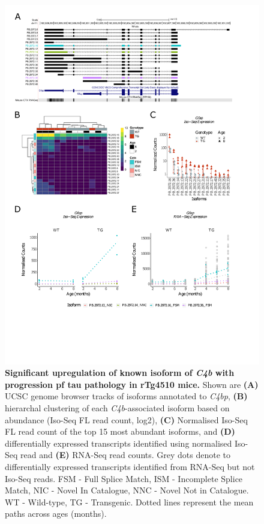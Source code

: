 \begin{figure}[!htp]
	\centering
	\includegraphics[page=2,trim={1.5cm 4.8cm 2cm 1cm}, scale = 0.85]{Figures/Ch5_DiffPlots.pdf}
	\captionsetup{width=0.95\textwidth}
	\caption[Differential \textit{C4b} transcript expression]%
	{\textbf{Significant upregulation of known isoform of \textit{C4b} with progression pf tau pathology in rTg4510 mice.} Shown are \textbf{(A)} UCSC genome browser tracks of isoforms annotated to \textit{C4bp}, \textbf{(B)} hierarchal clustering of each \textit{C4b}-associated isoform based on abundance (Iso-Seq FL read count, log2), \textbf{(C)} Normalised Iso-Seq FL read count of the top 15 most abundant isoforms, and \textbf{(D)} differentially expressed transcripts identified using normalised Iso-Seq read and \textbf{(E)} RNA-Seq read counts. Grey dots denote to differentially expressed transcripts identified from RNA-Seq but not Iso-Seq reads. FSM - Full Splice Match, ISM - Incomplete Splice Match, NIC - Novel In Catalogue, NNC - Novel Not in Catalogue. WT - Wild-type, TG - Transgenic. Dotted lines represent the mean paths across ages (months).}   
	\label{fig:DEI_c4b}
\end{figure}

